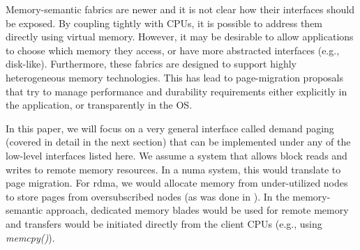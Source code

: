 Memory-semantic fabrics are newer and it is not clear how their interfaces
should be exposed. By coupling tightly with CPUs, it is possible to address
them directly using virtual memory. However, it may be desirable to allow
applications to choose which memory they access, or have more abstracted
interfaces (e.g., disk-like). Furthermore, these fabrics are designed to
support highly heterogeneous memory technologies. This has lead to
page-migration proposals that try to manage performance and durability
requirements either explicitly in the application, or transparently in the
OS\cite{heteros}\cite{mojim}.

In this paper, we will focus on a very general interface called demand paging
(covered in detail in the next section) that can be implemented under any of
the low-level interfaces listed here. We assume a system that allows block
reads and writes to remote memory resources. In a \gls{numa} system, this would
translate to page migration. For \gls{rdma}, we would allocate memory from
under-utilized nodes to store pages from oversubscribed nodes (as was done in
\cite{infiniswap}). In the memory-semantic approach, dedicated memory blades
would be used for remote memory and transfers would be initiated directly from
the client CPUs (e.g., using \emph{memcpy()}).
